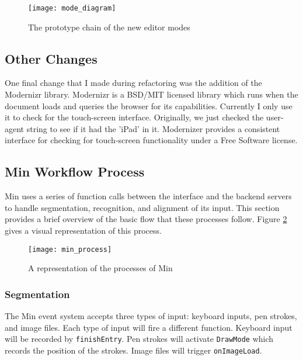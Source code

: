 \documentclass[letterpaper]{article}
\begin{document}
\begin{figure}[h]
    \begin{center}
        \texttt{[image: mode\_diagram]}
    \end{center}
    \caption{The prototype chain of the new editor modes}
    \label{fig:modes}
\end{figure}

\subsection*{Other Changes}

One final change that I made during refactoring was the addition of the
Modernizr library. Modernizr is a BSD/MIT licensed library which runs when the
document loads and queries the browser for its capabilities. Currently I only use it to
check for the touch-screen interface. Originally, we just checked the user-agent
string to see if it had the 'iPad' in it. Modernizer provides a consistent
interface for checking for touch-screen functionality under a Free Software
license.

\subsection*{Min Workflow Process}
Min uses a series of function calls between the interface and the backend servers to handle
segmentation, recognition, and alignment of its input. This section provides a brief overview
of the basic flow that these processes follow. Figure \ref{fig:frontToBack} gives a visual
representation of this process.

\begin{figure}[h]
    \begin{center}
        \texttt{[image: min\_process]}
    \end{center}
    \caption{A representation of the processes of Min}
    \label{fig:frontToBack}
\end{figure}

\subsubsection*{Segmentation}
The Min event system accepts three types of input: keyboard inputs, pen strokes, and
image files. Each type of input will fire a different function. Keyboard input will be
recorded by \verb+finishEntry+. Pen strokes will activate \verb+DrawMode+ which records
the position of the strokes. Image files will trigger \verb+onImageLoad+.
\end{document}
